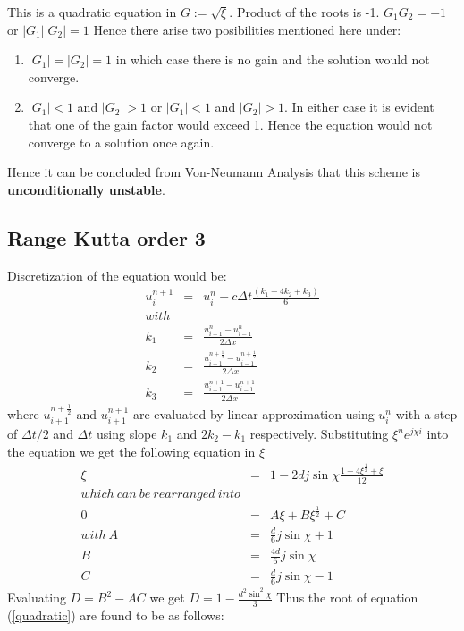 \documentclass[a4paper,12pt]{report}
\begin{document}
This is a quadratic equation in $G := \sqrt{\xi}$. Product of the roots is -1. \newline
$G_1G_2 = -1$ or $|G_1||G_2| = 1$
Hence there arise two posibilities mentioned here under:
\begin{enumerate}
\item $|G_1|=|G_2|=1$ in which case there is no gain and the solution would not converge.
\item $|G_1|<1$ and $|G_2|> 1$ or $|G_1|<1$ and $|G_2|> 1$. In either case it is evident that one of the gain factor would exceed 1. Hence the equation would not converge to a solution once again.
\end{enumerate}
Hence it can be concluded from Von-Neumann Analysis that this scheme is \textbf{unconditionally unstable}. 
\subsection{Range Kutta order 3}
Discretization of the equation would be:
\begin{eqnarray}
u^{n+1}_{i} &=& u^{n}_{i} - c\Delta t \frac{(k_1+4k_2+k_3)}{6}
\\with \nonumber\\
k_1 &=& \frac{u_{i+1}^{n} -u_{i-1}^{n}}{2\Delta x} \nonumber \\
k_2 &=& \frac{u_{i+1}^{n+\frac{1}{2}} -u_{i-1}^{n+\frac{1}{2}}}{2\Delta x} \nonumber\\
k_3 &=& \frac{u_{i+1}^{n+1} -u_{i-1}^{n+1}}{2\Delta x} \nonumber
\end{eqnarray}
where $u_{i+1}^{n+\frac{1}{2}}$ and $u_{i+1}^{n+1}$ are evaluated by linear approximation using $u^{n}_{i}$ with a step of $\Delta t/2$ and $\Delta t$ using slope $k_1$ and $2k_2-k_1$ respectively.
Substituting $\xi^{n}e^{j\chi i}$ into the equation we get the following equation in $\xi$
\begin{eqnarray}
\xi &=& 1-2dj\sin{\chi}\frac{1+4\xi^{\frac{1}{2}}+\xi}{12} \nonumber \\
which\ can\ be\ rearranged\ into \nonumber \\
0 &=& A\xi+B\xi^{\frac{1}{2}} + C \label{quadratic}\\
with\ A &=& \frac{d}{6}j\sin{\chi} + 1 \nonumber\\
B &=& \frac{4d}{6}j\sin{\chi} \nonumber\\
C &=& \frac{d}{6}j\sin{\chi} - 1 \nonumber
\end{eqnarray}
Evaluating $D = B^2 - AC$ we get $D = 1-\frac{d^2{\sin^2{\chi}}}{3}$
Thus the root of equation (\ref{quadratic}) are found to be as follows:
\end{document}
